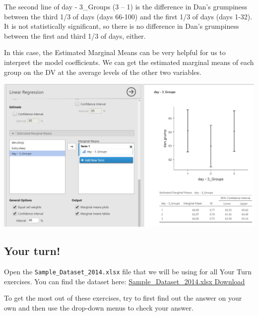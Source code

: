 \documentclass[
]{book}
\begin{document}
The second line of day - 3\_Groups (3 -- 1) is the difference in Dan's grumpiness between the third 1/3 of days (days 66-100) and the first 1/3 of days (days 1-32). It is not statistically significant, so there is no difference in Dan's grumpiness between the first and third 1/3 of days, either.

In this case, the Estimated Marginal Means can be very helpful for us to interpret the model coefficients. We can get the estimated marginal means of each group on the DV at the average levels of the other two variables.

\includegraphics{images/13-regression/regression-categorical-EMM.png}

\hypertarget{your-turn-9}{%
\subsection{Your turn!}\label{your-turn-9}}

Open the \texttt{Sample\_Dataset\_2014.xlsx} file that we will be using for all Your Turn exercises. You can find the dataset here: \href{https://github.com/danawanzer/stats-with-jamovi/blob/master/data/Sample_Dataset_2014.xlsx}{Sample\_Dataset\_2014.xlsx Download}

To get the most out of these exercises, try to first find out the answer on your own and then use the drop-down menus to check your answer.
\end{document}
